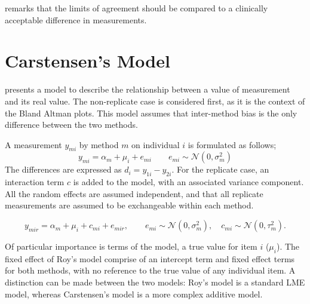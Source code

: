 \documentclass[12pt, a4paper]{report}
\theoremstyle{plain}
\theoremstyle{definition}
\theoremstyle{remark}
\begin{document}
	\citet{Dewitte} remarks that the limits of agreement should be
	compared to a clinically acceptable difference in measurements.

	
	\section{Carstensen's Model}
	
	\citet{BXC2004} presents a model to describe the relationship between a value of measurement and its
	real value. The non-replicate case is considered first, as it is the context of the Bland Altman plots. This model assumes that inter-method bias is the only difference between the two methods.
	
	A measurement $y_{mi}$ by method $m$ on individual $i$ is formulated as follows;
	\begin{equation}
	y_{mi}  = \alpha_{m} + \mu_{i} + e_{mi} \qquad  e_{mi} \sim
	\mathcal{N}(0,\sigma^{2}_{m})
	\end{equation}
	The differences are expressed as $d_{i} = y_{1i} - y_{2i}$. For the replicate case, an interaction term $c$ is added to the model, with an associated variance component. All the random effects are assumed independent, and that all replicate measurements are assumed to be exchangeable within each method.
	
	\begin{equation}
	y_{mir}  = \alpha_{m} + \mu_{i} + c_{mi} + e_{mir}, \qquad  e_{mi}
	\sim \mathcal{N}(0,\sigma^{2}_{m}), \quad c_{mi} \sim \mathcal{N}(0,\tau^{2}_{m}).
	\end{equation}
	
	Of particular importance is terms of the model, a true value for item $i$ ($\mu_{i}$).  The fixed effect of Roy's model comprise of an intercept term and fixed effect terms for both methods, with no reference to the true value of any individual item. A distinction can be made between the two models: Roy's model is a standard LME model, whereas Carstensen's model is a more complex additive model.
	
	\bigskip
	


\end{document}
